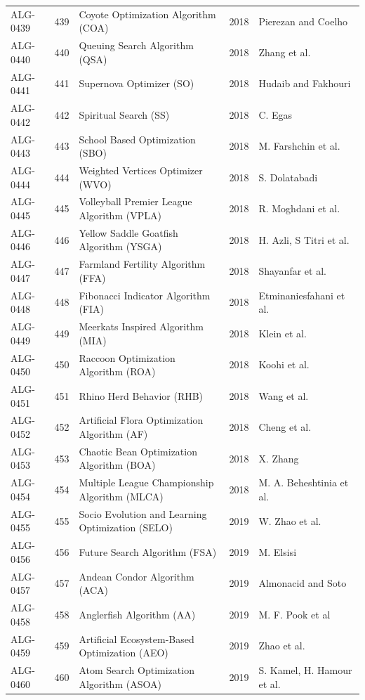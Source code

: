 \documentclass[8pt]{article}
\begin{document}
\begin{landscape}
\begin{longtable}{P{1.7cm}rP{10.0cm}rP{7.2cm}}
ALG-0439 & 439 & Coyote Optimization Algorithm (COA) & 2018 & Pierezan and Coelho \\
ALG-0440 & 440 & Queuing Search Algorithm (QSA) & 2018 & Zhang et al. \\
ALG-0441 & 441 & Supernova Optimizer (SO) & 2018 & Hudaib and Fakhouri \\
ALG-0442 & 442 & Spiritual Search (SS) & 2018 & C. Egas \\
ALG-0443 & 443 & School Based Optimization (SBO) & 2018 & M. Farshchin et al. \\
ALG-0444 & 444 & Weighted Vertices Optimizer (WVO) & 2018 & S. Dolatabadi \\
ALG-0445 & 445 & Volleyball Premier League Algorithm (VPLA) & 2018 & R. Moghdani et al. \\
ALG-0446 & 446 & Yellow Saddle Goatfish Algorithm (YSGA) & 2018 & H. Azli, S Titri et al. \\
ALG-0447 & 447 & Farmland Fertility Algorithm (FFA) & 2018 & Shayanfar et al. \\
ALG-0448 & 448 & Fibonacci Indicator Algorithm (FIA) & 2018 & Etminaniesfahani et al. \\
ALG-0449 & 449 & Meerkats Inspired Algorithm (MIA) & 2018 & Klein et al. \\
ALG-0450 & 450 & Raccoon Optimization Algorithm (ROA) & 2018 & Koohi et al. \\
ALG-0451 & 451 & Rhino Herd Behavior (RHB) & 2018 & Wang et al. \\
ALG-0452 & 452 & Artificial Flora Optimization Algorithm (AF) & 2018 & Cheng et al. \\
ALG-0453 & 453 & Chaotic Bean Optimization Algorithm (BOA) & 2018 & X. Zhang \\
ALG-0454 & 454 & Multiple League Championship Algorithm (MLCA) & 2018 & M. A. Beheshtinia et al. \\
ALG-0455 & 455 & Socio Evolution and Learning Optimization (SELO) & 2019 & W. Zhao et al. \\
ALG-0456 & 456 & Future Search Algorithm (FSA) & 2019 & M. Elsisi \\
ALG-0457 & 457 & Andean Condor Algorithm (ACA) & 2019 & Almonacid and Soto \\
ALG-0458 & 458 & Anglerfish Algorithm (AA) & 2019 & M. F. Pook et al \\
ALG-0459 & 459 & Artificial Ecosystem-Based Optimization (AEO) & 2019 & Zhao et al. \\
ALG-0460 & 460 & Atom Search Optimization Algorithm (ASOA) & 2019 & S. Kamel, H. Hamour et al. \\

\end{longtable}
\end{landscape}
\end{document}
